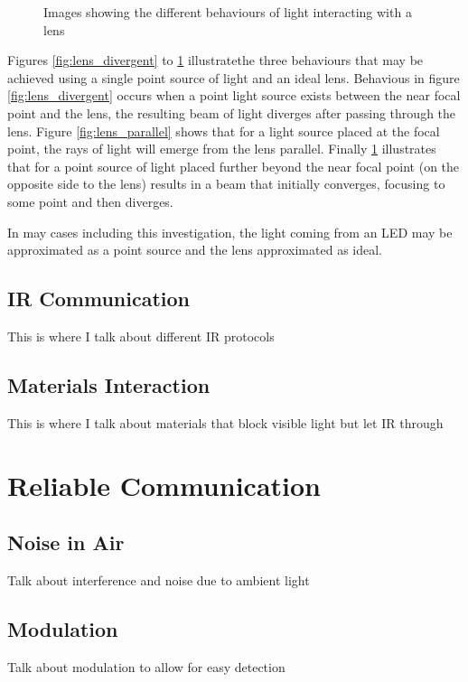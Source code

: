 \begin{figure}[H]
\begin{minipage}{.3\textwidth}
		\label{fig:lens_convergent}
	\end{minipage}
	\caption*{Images showing the different behaviours of light interacting with a lens}
\end{figure}

Figures \ref{fig:lens_divergent} to \ref{fig:lens_convergent} illustrate\footnotemark the three behaviours that may be achieved using a single point source of light and an ideal lens. Behavious in figure \ref{fig:lens_divergent} occurs when a point light source exists between the near focal point and the lens, the resulting beam of light diverges after passing through the lens. Figure \ref{fig:lens_parallel} shows that for a light source placed at the focal point, the rays of light will emerge from the lens parallel. Finally \ref{fig:lens_convergent} illustrates that for a point source of light placed further beyond the near focal point (on the opposite side to the lens) results in a beam that initially converges, focusing to some point and then diverges.

In may cases including this investigation, the light coming from an LED may be approximated as a point source and the lens approximated as ideal.


\subsection{IR Communication}
This is where I talk about different IR protocols

\subsection{Materials Interaction}
This is where I talk about materials that block visible light but let IR through


\section{Reliable Communication}

\subsection{Noise in Air}
Talk about interference and noise due to ambient light

\subsection{Modulation}
Talk about modulation to allow for easy detection

